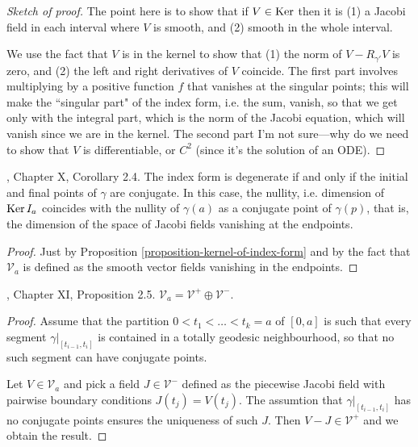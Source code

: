 \begin{proof}[Sketch of proof]
The point here is to show that if $V \in \mathop{\mathrm{Ker}}$ then it is (1) a Jacobi
 field in each interval where $V$ is smooth, and (2) smooth in the whole
 interval.

We use the fact that $V$ is in the kernel to show that (1) the norm of 
$V-R_{\gamma'}V$ is zero, and (2) the left and right derivatives of $V$
coincide. The first part involves multiplying by a positive function $f$ that
vanishes at the singular points; this will make the ``singular part" of the
index form, i.e. the sum, vanish, so that we get only with the integral part,
which is the norm of the Jacobi equation, which will vanish since we are in the
kernel. The second part I'm not sure---why do we need to show that $V$ is
differentiable, or $C^2$ (since it's the solution of an ODE).
\end{proof}

\begin{lemma}
\label{lemma-index-form-is-degenerate-iff-conjugate-points}
\cite{doc}, Chapter X, Corollary 2.4. The index form is degenerate if and only 
if the initial and final points of $\gamma$ are conjugate. In this case, the 
nullity, i.e. dimension of $\mathop{\mathrm{Ker}} I_a$ coincides with the nullity of $\gamma(a)$ 
as a conjugate point of $\gamma(p)$, that is, the dimension of the space of 
Jacobi fields vanishing at the endpoints.
\end{lemma}

\begin{proof}
Just by Proposition \ref{proposition-kernel-of-index-form} and by the fact that
$\mathcal{V}_a$ is defined as the smooth vector fields vanishing in the
endpoints.
\end{proof}

\begin{proposition}
\label{proposition-V-is-direct-sum}
\cite{doc}, Chapter XI, Proposition 2.5. 
$\mathcal{V}_a=\mathcal{V}^+ \oplus \mathcal{V}^-$.
\end{proposition}

\begin{proof}
Assume that the partition $0<t_1<\ldots<t_k=a$ of $[0,a]$ is such that every
segment $\gamma|_{[t_{i-1},t_i]}$ is contained in a totally geodesic
neighbourhood, so that no such segment can have conjugate points.

Let $V \in \mathcal{V}_a$ and pick a field $J \in \mathcal{V}^-$ defined as the
piecewise Jacobi field with pairwise boundary conditions $J(t_j)=V(t_j)$. The
assumtion that $\gamma|_{[t_{i-1},t_i]}$ has no conjugate points ensures the
uniqueness of such $J$. Then $V-J\in\mathcal{V}^+$ and we obtain the result.
\end{proof}


